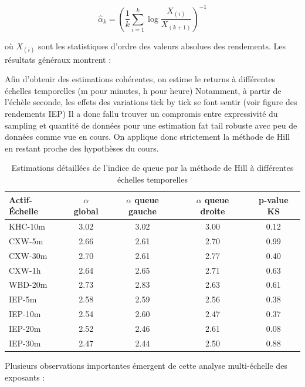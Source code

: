 \documentclass[10pt,a4paper]{article}
\theoremstyle{definition}
\theoremstyle{remark}
\begin{document}
\begin{itemize}
\begin{equation}
\hat{\alpha}_k = \left(\frac{1}{k} \sum_{i=1}^k \log \frac{X_{(i)}}{X_{(k+1)}}\right)^{-1}
\end{equation}

où $X_{(i)}$ sont les statistiques d'ordre des valeurs absolues des rendements. Les résultats généraux montrent :

Afin d'obtenir des estimations cohérentes, on estime le returns à différentes échelles temporelles (m pour minutes, h pour heure)
Notamment, à partir de l'échèle seconde, les effets des variations tick by tick se font sentir (voir figure des rendements IEP)
Il a donc fallu trouver un compromis entre expressivité du sampling et quantité de données pour une estimation fat tail robuste avec peu de données comme vue en cours.
On applique donc strictement la méthode de Hill en restant proche des hypothèses du cours.



\begin{table}[H]
\centering
\begin{tabular}{lcccc}
\toprule
Actif-Échelle & $\alpha$ global & $\alpha$ queue gauche & $\alpha$ queue droite & p-value KS \\
\midrule
KHC-10m & 3.02 & 3.02 & 3.00 & 0.12 \\
\midrule
CXW-5m & 2.66 & 2.61 & 2.70 & 0.99 \\
CXW-30m & 2.70 & 2.61 & 2.77 & 0.40 \\
CXW-1h & 2.64 & 2.65 & 2.71 & 0.63 \\
\midrule
WBD-20m & 2.73 & 2.83 & 2.63 & 0.61 \\
\midrule
IEP-5m & 2.58 & 2.59 & 2.56 & 0.38 \\
IEP-10m & 2.54 & 2.60 & 2.47 & 0.37 \\
IEP-20m & 2.52 & 2.46 & 2.61 & 0.08 \\
IEP-30m & 2.47 & 2.44 & 2.50 & 0.88 \\
\bottomrule
\end{tabular}
\caption{Estimations détaillées de l'indice de queue par la méthode de Hill à différentes échelles temporelles}
\label{tab:hill_detail_moved}
\end{table}

Plusieurs observations importantes émergent de cette analyse multi-échelle des exposants :


\end{itemize}
\end{document}
